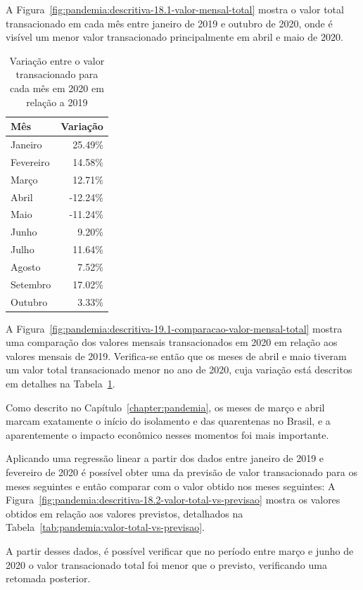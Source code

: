 A Figura~\ref{fig:pandemia:descritiva-18.1-valor-mensal-total} mostra o valor total transacionado em cada mês entre janeiro de 2019 e outubro de 2020, onde é visível um menor valor transacionado principalmente em abril e maio de 2020.

\begin{table}[htb]
\centering
\caption{Variação entre o valor transacionado para cada mês em 2020 em relação a 2019}
\label{tab:comparacao-valor-mensal-total}
\begin{tabular}{lr}
\toprule
Mês & Variação \\
\midrule
Janeiro &   25.49\% \\
Fevereiro & 14.58\% \\
Março &     12.71\% \\
Abril &    -12.24\% \\
Maio &     -11.24\% \\
Junho &      9.20\% \\
Julho &     11.64\% \\
Agosto &     7.52\% \\
Setembro &  17.02\% \\
Outubro &    3.33\% \\
\bottomrule
\end{tabular}
\fdadospesquisa
\end{table}

A Figura~\ref{fig:pandemia:descritiva-19.1-comparacao-valor-mensal-total} mostra uma comparação dos valores mensais transacionados em 2020 em relação aos valores mensais de 2019. Verifica-se então que os meses de abril e maio tiveram um valor total transacionado menor no ano de 2020, cuja variação está descritos em detalhes na Tabela~\ref{tab:comparacao-valor-mensal-total}.

Como descrito no Capítulo~\ref{chapter:pandemia}, os meses de março e abril marcam exatamente o início do isolamento e das quarentenas no Brasil, e a aparentemente o impacto econômico nesses momentos foi mais importante.

Aplicando uma regressão linear a partir dos dados entre janeiro de 2019 e fevereiro de 2020 é possível obter uma da previsão de valor transacionado para os meses seguintes e então comparar com o valor obtido nos meses seguintes: A Figura~\ref{fig:pandemia:descritiva-18.2-valor-total-vs-previsao} mostra os valores obtidos em relação aos valores previstos, detalhados na Tabela~\ref{tab:pandemia:valor-total-vs-previsao}.

A partir desses dados, é possível verificar que no período entre março e junho de 2020 o valor transacionado total foi menor que o previsto, verificando uma retomada posterior.

